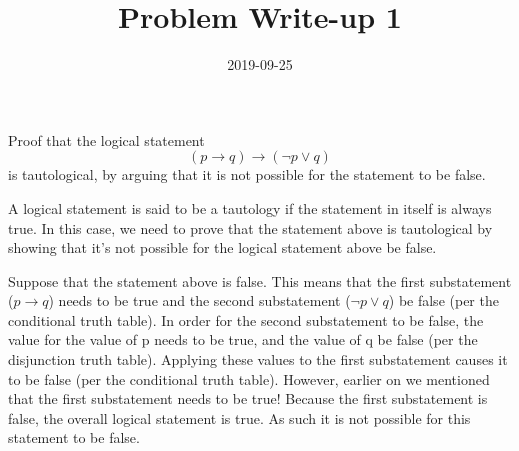 \documentclass[a4paper,12pt]{article}
\title{Problem Write-up 1}
\date{2019-09-25}
\begin{document}
\begin{problem}
    Proof that the logical statement \[(p \to q) \to (\neg p \vee q)\] is tautological, by arguing that it is not possible for the statement to be false.
\end{problem}

\begin{answer}
   A logical statement is said to be a tautology if the statement in itself is always true. In this case, we need to prove that the statement above is tautological by showing that it's not possible for the logical statement above be false.

   Suppose that the statement above is false. This means that the first substatement (\(p \to q\)) needs to be true and the second substatement (\(\neg p \vee q\)) be false (per the conditional truth table). In order for the second substatement to be false, the value for the value of p needs to be true, and the value of q be false (per the disjunction truth table). Applying these values to the first substatement causes it to be false (per the conditional truth table). However, earlier on we mentioned that the first substatement needs to be true! Because the first substatement is false, the overall logical statement is true. As such it is not possible for this statement to be false.
\end{answer}
\end{document}
